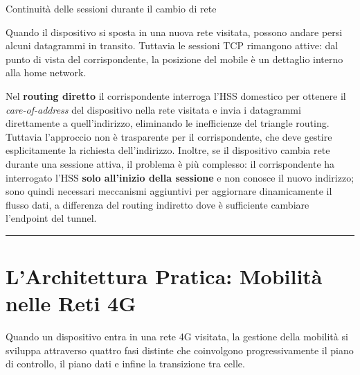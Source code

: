 \documentclass[
  italian,
  openany]{book}
\begin{document}
\begin{calloutnote}{Continuità delle sessioni durante il cambio di rete}

Quando il dispositivo si sposta in una nuova rete visitata, possono
andare persi alcuni datagrammi in transito. Tuttavia le sessioni TCP
rimangono attive: dal punto di vista del corrispondente, la posizione
del mobile è un dettaglio interno alla home network.

\end{calloutnote}

Nel \textbf{routing diretto} il corrispondente interroga l'HSS domestico
per ottenere il \emph{care-of-address} del dispositivo nella rete
visitata e invia i datagrammi direttamente a quell'indirizzo, eliminando
le inefficienze del triangle routing. Tuttavia l'approccio non è
trasparente per il corrispondente, che deve gestire esplicitamente la
richiesta dell'indirizzo. Inoltre, se il dispositivo cambia rete durante
una sessione attiva, il problema è più complesso: il corrispondente ha
interrogato l'HSS \textbf{solo all'inizio della sessione} e non conosce
il nuovo indirizzo; sono quindi necessari meccanismi aggiuntivi per
aggiornare dinamicamente il flusso dati, a differenza del routing
indiretto dove è sufficiente cambiare l'endpoint del tunnel.

\begin{center}\rule{0.5\linewidth}{0.5pt}\end{center}

\section{L'Architettura Pratica: Mobilità nelle Reti
4G}\label{larchitettura-pratica-mobilituxe0-nelle-reti-4g}

Quando un dispositivo entra in una rete 4G visitata, la gestione della
mobilità si sviluppa attraverso quattro fasi distinte che coinvolgono
progressivamente il piano di controllo, il piano dati e infine la
transizione tra celle.
\end{document}
